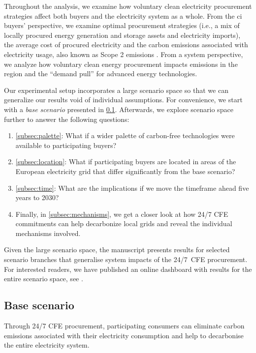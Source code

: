 
Throughout the analysis, we examine how voluntary clean electricity procurement strategies affect both buyers and the electricity system as a whole.
From the \gls{ci} buyers' perspective, we examine optimal procurement strategies (i.e., a mix of locally procured energy generation and storage assets and electricity imports), the average cost of procured electricity and the carbon emissions associated with electricity usage, also known as Scope 2 emissions \cite{GHGProtocolScope2}.
From a system perspective, we analyze how voluntary clean energy procurement impacts \co emissions in the region and the \enquote{demand pull} for advanced energy technologies.

Our experimental setup incorporates a large scenario space so that we can generalize our results void of individual assumptions.
For convenience, we start with a \textit{base scenario} presented in \cref{subsec:base}.
Afterwards, we explore scenario space further to answer the following questions:

\begin{enumerate}[-]
\item \cref{subsec:palette}: What if a wider palette of carbon-free technologies were available to participating buyers?
\item \cref{subsec:location}: What if participating buyers are located in areas of the European electricity grid that differ significantly from the base scenario?
\item \cref{subsec:time}: What are the implications if we move the timeframe ahead five years to 2030?
\item Finally, in \cref{subsec:mechanisms}, we get a closer look at how 24/7 CFE commitments can help decarbonize local grids and reveal the individual mechanisms involved.
\end{enumerate}

Given the large scenario space, the manuscript presents results for selected scenario branches that generalise system impacts of the 24/7~CFE procurement.
For interested readers, we have published an online dashboard with results for the entire scenario space, see .

\subsection{Base scenario}
\label{subsec:base}

\begin{res}
    Through 24/7 CFE procurement, participating consumers can eliminate carbon emissions associated with their electricity consumption and help to decarbonise the entire electricity system.
\end{res}

